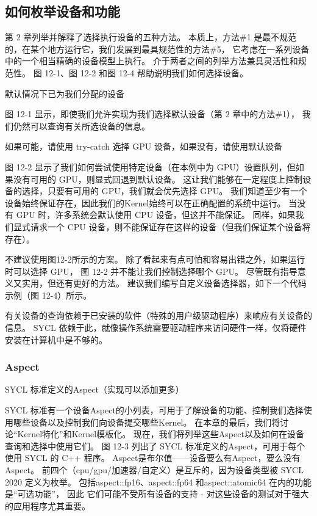 \subsection{如何枚举设备和功能}
第 2 章列举并解释了选择执行设备的五种方法。 
本质上，方法\#1 是最不规范的，在某个地方运行它，我们发展到最具规范性的方法\#5，
它考虑在一系列设备中的一个相当精确的设备模型上执行。 介于两者之间的列举方法兼具灵活性和规范性。 
图 12-1、图 12-2 和图 12-4 帮助说明我们如何选择设备。

{\color{red} 默认情况下已为我们分配的设备}

图 12-1 显示，即使我们允许实现为我们选择默认设备（第 2 章中的方法\#1），
我们仍然可以查询有关所选设备的信息。

{\color{red} 如果可能，请使用 try-catch 选择 GPU 设备，如果没有，请使用默认设备}

图 12-2 显示了我们如何尝试使用特定设备（在本例中为 GPU）设置队列，但如果没有可用的 GPU，则显式回退到默认设备。 
这让我们能够在一定程度上控制设备的选择，只要有可用的 GPU，我们就会优先选择 GPU。 
我们知道至少有一个设备始终保证存在，因此我们的Kernel始终可以在正确配置的系统中运行。 
当没有 GPU 时，许多系统会默认使用 CPU 设备，但这并不能保证。 
同样，如果我们显式请求一个 CPU 设备，则不能保证存在这样的设备（但我们保证某个设备将存在）。

不建议使用图12-2所示的方案。 除了看起来有点可怕和容易出错之外，如果运行时可以选择 GPU，
图 12-2 并不能让我们控制选择哪个 GPU。 尽管既有指导意义又实用，但还有更好的方法。 
建议我们编写自定义设备选择器，如下一个代码示例（图 12-4）所示。

有关设备的查询依赖于已安装的软件（特殊的用户级驱动程序）来响应有关设备的信息。 
SYCL 依赖于此，就像操作系统需要驱动程序来访问硬件一样，仅将硬件安装在计算机中是不够的。

\subsubsection{Aspect}
{\color{red} SYCL 标准定义的Aspect（实现可以添加更多）}

SYCL 标准有一个设备Aspect的小列表，可用于了解设备的功能、控制我们选择使用哪些设备以及控制我们向设备提交哪些Kernel。 
在本章的最后，我们将讨论“Kernel特化”和Kernel模板化。 现在，我们将列举这些Aspect以及如何在设备查询和选择中使用它们。 
图 12-3 列出了 SYCL 标准定义的Aspect，可用于每个使用 SYCL 的 C++ 程序。 
Aspect是布尔值——设备要么有Aspect，要么没有Aspect。 
前四个（cpu/gpu/加速器/自定义）是互斥的，因为设备类型被 SYCL 2020 定义为枚举。
包括aspect::fp16、aspect::fp64 和aspect::atomic64 在内的功能是“可选功能”，
因此 它们可能不受所有设备的支持 - 对这些设备的测试对于强大的应用程序尤其重要。

